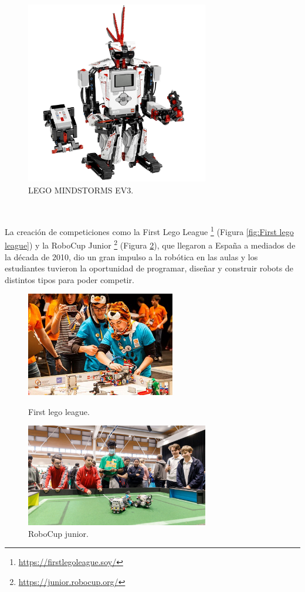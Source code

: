 \begin{figure} [h!]
  \begin{center}
    \includegraphics[width=8cm]{figs/lego}
  \end{center}
  \caption{LEGO MINDSTORMS EV3.}
  \label{fig:lego}
\end{figure}\



La creación de competiciones como la First Lego League \footnote{\url{https://firstlegoleague.soy/}} (Figura \ref{fig:First lego league}) y la RoboCup Junior \footnote{\url{https://junior.robocup.org/}} (Figura \ref{fig:RoboCup junior}), que llegaron a España a mediados de la década de 2010, dio un gran impulso a la robótica en las aulas y los estudiantes tuvieron la oportunidad de programar, diseñar y construir robots de distintos tipos para poder competir.



\begin{figure}[h!]
  \begin{minipage}{0.48\textwidth}
    \centering
    \includegraphics[width=6.5cm]{figs/first-lego-league.jpg}
    \caption{First lego league.}
    \label{fig:First lego league}
  \end{minipage}
  \hfill
  \begin{minipage}{0.48\textwidth}
    \centering
    \includegraphics[width=8cm]{figs/RoboCup_junior.jpg}
    \caption{RoboCup junior.} 
    \label{fig:RoboCup junior}
  \end{minipage}
\end{figure}


